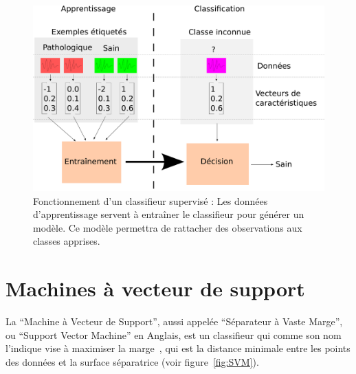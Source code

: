 \begin{figure}[h]
	\begin{center}
	\includegraphics[width=15cm]{images/fonctionnementClassif}
	\end{center}
	\caption{Fonctionnement d'un classifieur supervisé : Les données d'apprentissage servent à entraîner le classifieur pour générer un modèle. Ce modèle permettra de rattacher des observations aux classes apprises.}
	\label{fig:fonctClassif}
\end{figure}


	\section{Machines à vecteur de support}

\label{lab:SVM}
La ``Machine à Vecteur de Support'', aussi appelée ``Séparateur à Vaste Marge'', ou ``Support Vector Machine'' en Anglais, est un classifieur qui comme son nom l'indique vise à maximiser la marge~\cite{boser1992training}, qui est la distance minimale entre les points des données et la surface séparatrice (voir figure~\ref{fig:SVM}).


